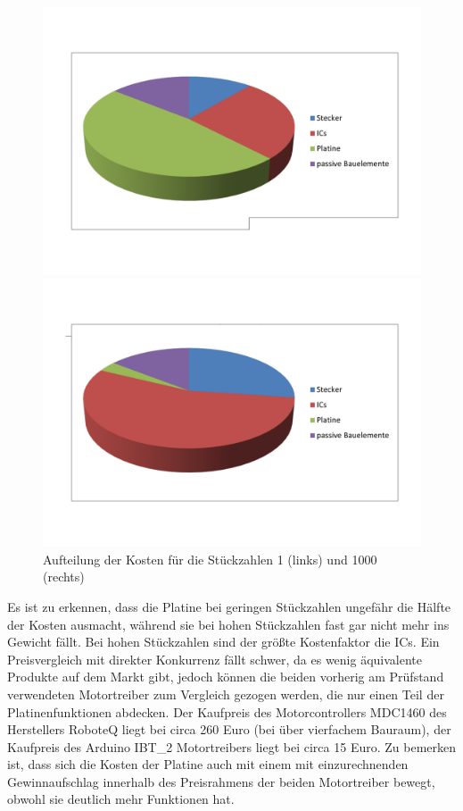 \begin{figure}[H]
\begin{minipage}[h]{0.5\textwidth}
\includegraphics[width=\textwidth]{./Bilder/Platinenkosten.pdf}
\end{minipage}
\begin{minipage}[h]{0.5\textwidth}
\includegraphics[width=\textwidth]{./Bilder/Platinenkosten-tausend.pdf}
\end{minipage}
\caption{Aufteilung der Kosten für die Stückzahlen 1 (links) und 1000 (rechts)}
	\label{fig:LDO}
\end{figure}\noindent
Es ist zu erkennen, dass die Platine bei geringen Stückzahlen ungefähr die Hälfte der Kosten ausmacht, während sie bei hohen Stückzahlen fast gar nicht mehr ins Gewicht fällt. Bei hohen Stückzahlen sind der größte Kostenfaktor die ICs. 
Ein Preisvergleich mit direkter Konkurrenz fällt schwer, da es wenig äquivalente Produkte auf dem Markt gibt, jedoch können die beiden vorherig am Prüfstand verwendeten Motortreiber zum Vergleich gezogen werden, die nur einen Teil der Platinenfunktionen abdecken. Der Kaufpreis des Motorcontrollers MDC1460 des Herstellers RoboteQ liegt bei circa 260 Euro (bei über vierfachem Bauraum), der Kaufpreis des Arduino IBT\_2 Motortreibers liegt bei circa 15 Euro. Zu bemerken ist, dass sich die Kosten der Platine auch mit einem mit einzurechnenden Gewinnaufschlag innerhalb des Preisrahmens der beiden Motortreiber bewegt, obwohl sie deutlich mehr Funktionen hat.

